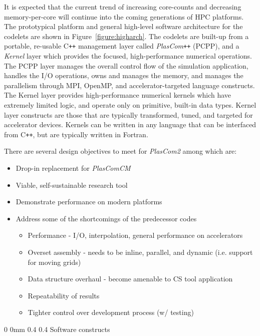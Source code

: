 \documentclass[11pt]{article}
\makeatletter
\renewcommand{\section}{\@startsection
{section}%
{0}%
{0mm}%
{0.4\baselineskip}%
{0.4\baselineskip}%
{\normalfont\Large\bfseries\color{myBrown}}}%
\newcommand{\plusplus}[1]{#1{}\texttt{++}}
\makeatother
\begin{document}
It is expected that the current trend of increasing core-counts and decreasing memory-per-core will continue into the coming generations of HPC platforms. The prototypical platform and general high-level software architecture for the codelets are shown in Figure~\ref{figure:higharch}. The codelets are built-up from a portable, re-usable \plusplus{C} management layer called \plusplus{\textit{PlasCom}} (PCPP), and a \textit{Kernel} layer which provides the focused, high-performance numerical operations. The PCPP layer manages the overall control flow of the simulation application, handles the I/O operations, owns and manages the memory, and manages the parallelism through MPI, OpenMP, and accelerator-targeted language constructs.  The Kernel layer provides high-performance numerical kernels which have extremely limited logic, and operate only on primitive, built-in data types.  Kernel layer constructs are those that are typically transformed, tuned, and targeted for accelerator devices.  Kernels can be written in any language that can be interfaced from \plusplus{C}, but are typically written in Fortran.

There are several design objectives to meet for \textit{PlasCom2} among which are:
\begin{itemize}
\item Drop-in replacement for \textit{PlasComCM}
\item Viable, self-sustainable research tool
\item Demonstrate performance on modern platforms 
\item Address some of the shortcomings of the predecessor codes
\begin{itemize}
\item Performance - I/O, interpolation, general performance on accelerators
\item Overset assembly - needs to be inline, parallel, and dynamic (i.e. support for moving grids)
\item Data structure overhaul - become amenable to CS tool application
\item Repeatability of results
\item Tighter control over development process (w/ testing)
\end{itemize}
\end{itemize}
\section{Software constructs}
\end{document}
